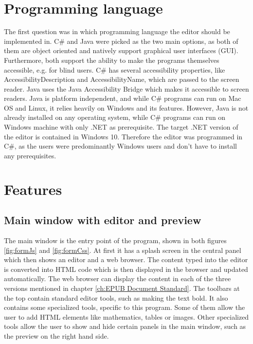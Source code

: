 \section{Programming language}

The first question was in which programming language the editor should be implemented in. C\# and Java were picked as the two main options, as both of them are object oriented and natively support graphical user interfaces (GUI). Furthermore, both support the ability to make the programs themselves accessible, e.g. for blind users. C\# has several accessibility properties, like AccessibilityDescription and AccessibilityName, which are passed to the screen reader. Java uses the Java Accessibility Bridge which makes it accessible to screen readers. Java is platform independent, and while C\# programs can run on Mac OS and Linux, it relies heavily on Windows and its features. However, Java is not already installed on any operating system, while C\# programs can run on Windows machine with only .NET as prerequisite. The target .NET version of the editor is contained in Windows 10. Therefore the editor was programmed in C\#, as the users were predominantly Windows users and don't have to install any prerequisites.

\section{Features}

\subsection{Main window with editor and preview}

The main window is the entry point of the program, shown in both figures \ref{fig:formJs} and \ref{fig:formCss}. At first it has a splash screen in the central panel which then shows an editor and a web browser. The content typed into the editor is converted into HTML code which is then displayed in the browser and updated automatically. The web browser can display the content in each of the three versions mentioned in chapter \ref{ch:EPUB Document Standard}. The toolbars at the top contain standard editor tools, such as making the text bold. It also contains some specialized tools, specific to this program. Some of them allow the user to add HTML elements like mathematics, tables or images. Other specialized tools allow the user to show and hide certain panels in the main window, such as the preview on the right hand side. 


